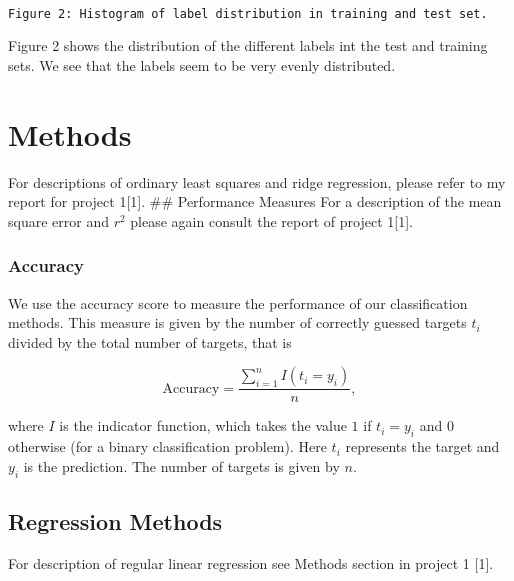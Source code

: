 \documentclass[11pt]{article}
\begin{document}
    \begin{center}
    \end{center}
    { \hspace*{\fill} \\}
    
    \begin{Verbatim}[commandchars=\\\{\}]
Figure 2: Histogram of label distribution in training and test set.
    \end{Verbatim}

    Figure 2 shows the distribution of the different labels int the test and
training sets. We see that the labels seem to be very evenly
distributed.

    \hypertarget{methods}{%
\section{Methods}\label{methods}}

For descriptions of ordinary least squares and ridge regression, please
refer to my report for project 1{[}1{]}. \#\# Performance Measures For a
description of the mean square error and \(r^2\) please again consult
the report of project 1{[}1{]}.

\hypertarget{accuracy}{%
\subsubsection{Accuracy}\label{accuracy}}

We use the accuracy score to measure the performance of our
classification methods. This measure is given by the number of correctly
guessed targets \(t_i\) divided by the total number of targets, that is

\[
\text{Accuracy} = \frac{\sum_{i=1}^n I(t_i = y_i)}{n} ,
\]

where \(I\) is the indicator function, which takes the value \(1\) if
\(t_i = y_i\) and \(0\) otherwise (for a binary classification problem).
Here \(t_i\) represents the target and \(y_i\) is the prediction. The
number of targets is given by \(n\).

    \hypertarget{regression-methods}{%
\subsection{Regression Methods}\label{regression-methods}}

For description of regular linear regression see Methods section in
project 1 {[}1{]}.
\end{document}
